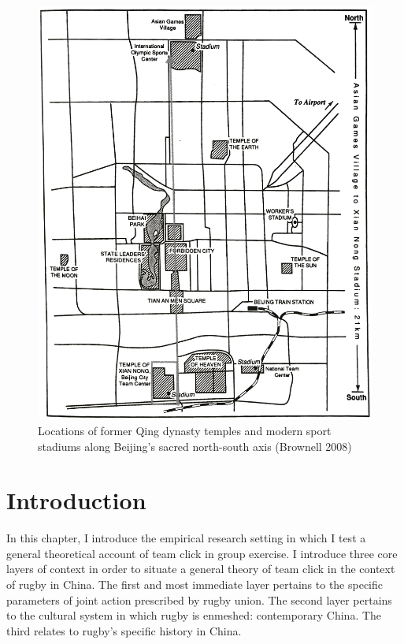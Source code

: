 \begin{CJK}{UTF8}{gbsn}
\begin{figure}[htbp]
    \centering
  \includegraphics[scale =.1]{images/beijingTemplesXNT.png}
  \caption{Locations of former Qing dynasty temples and modern sport stadiums along Beijing's sacred north-south axis (Brownell 2008)}
  \label{fig:beijingTemplesXNT}
\end{figure}



\section{Introduction}
In this chapter, I introduce the empirical research setting in which I test a general theoretical account of team click in group exercise.  I introduce three core layers of context in order to situate a general theory of team click in the context of rugby in China.  The first and most immediate layer pertains to the specific parameters of joint action prescribed by rugby union.  The second layer pertains to the cultural system in which rugby is enmeshed: contemporary China. The third relates to rugby's specific history in China.


\end{CJK}
